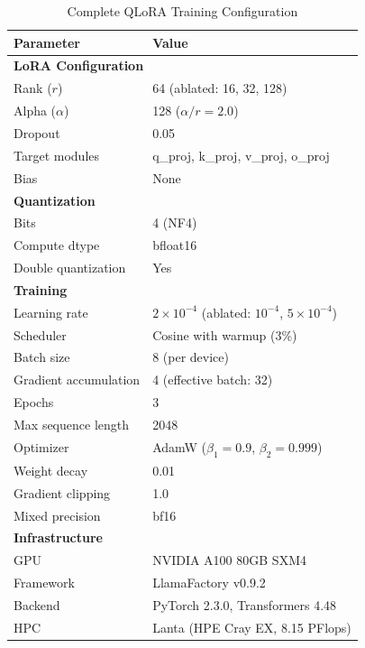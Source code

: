 \documentclass[journal]{IEEEtran}
\begin{document}
\begin{table}[!ht]
\centering
\caption{Complete QLoRA Training Configuration}
\label{tab:hyperparams}
\begin{tabular}{ll}
\toprule
\textbf{Parameter} & \textbf{Value} \\
\midrule
\multicolumn{2}{l}{\textbf{LoRA Configuration}} \\
\quad Rank ($r$) & 64 (ablated: 16, 32, 128) \\
\quad Alpha ($\alpha$) & 128 ($\alpha/r = 2.0$) \\
\quad Dropout & 0.05 \\
\quad Target modules & q\_proj, k\_proj, v\_proj, o\_proj \\
\quad Bias & None \\
\midrule
\multicolumn{2}{l}{\textbf{Quantization}} \\
\quad Bits & 4 (NF4) \\
\quad Compute dtype & bfloat16 \\
\quad Double quantization & Yes \\
\midrule
\multicolumn{2}{l}{\textbf{Training}} \\
\quad Learning rate & $2 \times 10^{-4}$ (ablated: $10^{-4}$, $5 \times 10^{-4}$) \\
\quad Scheduler & Cosine with warmup (3\%) \\
\quad Batch size & 8 (per device) \\
\quad Gradient accumulation & 4 (effective batch: 32) \\
\quad Epochs & 3 \\
\quad Max sequence length & 2048 \\
\quad Optimizer & AdamW ($\beta_1=0.9$, $\beta_2=0.999$) \\
\quad Weight decay & 0.01 \\
\quad Gradient clipping & 1.0 \\
\quad Mixed precision & bf16 \\
\midrule
\multicolumn{2}{l}{\textbf{Infrastructure}} \\
\quad GPU & NVIDIA A100 80GB SXM4 \\
\quad Framework & LlamaFactory v0.9.2 \\
\quad Backend & PyTorch 2.3.0, Transformers 4.48 \\
\quad HPC & Lanta (HPE Cray EX, 8.15 PFlops) \\
\bottomrule
\end{tabular}
\end{table}
\end{document}
